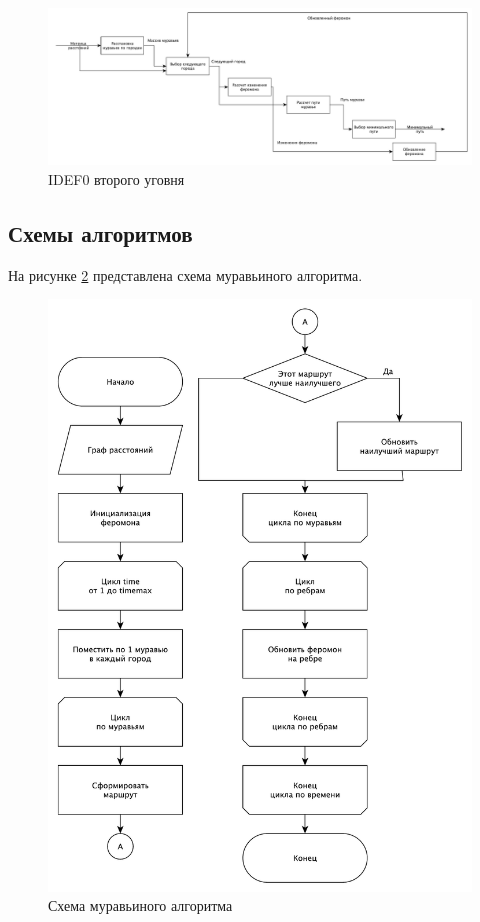 \documentclass[a4paper,12pt]{article}
\begin{document}
\begin{figure}[H]
    \centering
    \includegraphics[scale=0.3]{idef0_lvl2}
    \caption{IDEF0 второго уговня}
    \label{img:idef0_2}
\end{figure}

\subsection{Схемы алгоритмов}

На рисунке \ref{img:ant} представлена схема муравьиного алгоритма.

\begin{figure}[H]
    \centering
    \includegraphics[scale=0.7]{ant}
    \caption{Схема муравьиного алгоритма}
    \label{img:ant}
\end{figure}
\end{document}

